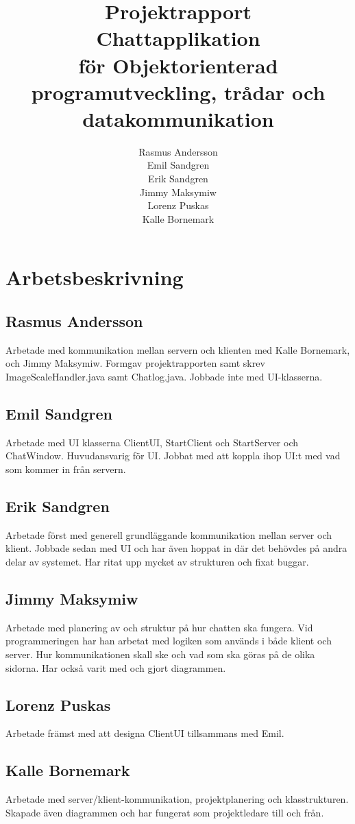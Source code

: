 \documentclass[a4paper,11pt]{article}
\title{Projektrapport\\
\large{Chattapplikation}\\
\large{för Objektorienterad programutveckling, trådar och datakommunikation} }
\author{Rasmus Andersson\\Emil Sandgren\\Erik Sandgren\\Jimmy Maksymiw\\Lorenz Puskas\\Kalle Bornemark}
\begin{document}
\pagestyle{fancy}
\maketitle
\newpage
\tableofcontents
\newpage

\section{Arbetsbeskrivning}

\subsection{Rasmus Andersson} 
Arbetade med kommunikation mellan servern och klienten med Kalle Bornemark, och Jimmy Maksymiw. Formgav projektrapporten samt skrev ImageScaleHandler.java samt Chatlog.java. Jobbade inte med UI-klasserna.

\subsection{Emil Sandgren} 
Arbetade med UI klasserna ClientUI, StartClient och StartServer och ChatWindow. Huvudansvarig för UI. Jobbat med att koppla ihop UI:t med vad som kommer in från servern. 

\subsection{Erik Sandgren} 

Arbetade först med generell grundläggande kommunikation mellan server och klient. Jobbade sedan med UI och har även hoppat in där det behövdes på andra delar av systemet. Har ritat upp mycket av strukturen och fixat buggar.

\subsection{Jimmy Maksymiw} 
Arbetade med planering av och struktur på hur chatten ska fungera. Vid programmeringen har han arbetat med logiken som används i både klient och server. Hur kommunikationen skall ske och vad som ska göras på de olika sidorna. Har också varit med och gjort diagrammen. 
\subsection{Lorenz Puskas} 
Arbetade främst med att designa ClientUI tillsammans med Emil.
\subsection{Kalle Bornemark} 
Arbetade med server/klient-kommunikation, projektplanering och klasstrukturen. Skapade även diagrammen och har fungerat som projektledare till och från.
\end{document}
